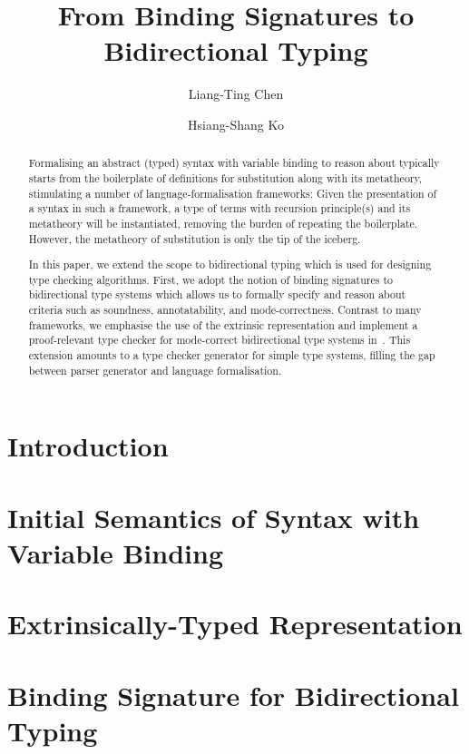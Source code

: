 \documentclass[envcountsect,runningheads,a4paper]{llncs}
\title{From Binding Signatures to Bidirectional Typing}
\author{Liang-Ting Chen\orcidID{0000-0002-3250-1331} \and Hsiang-Shang Ko\orcidID{0000-0002-2439-1048}}
\institute{Institute of Information Science, Academia Sinica, Taiwan}
\begin{document}
\maketitle

\begin{abstract}
  Formalising an abstract (typed) syntax with variable binding to reason about typically starts from the boilerplate of definitions for substitution along with its metatheory, stimulating a number of language-formalisation frameworks:
  Given the presentation of a syntax in such a framework, a type of terms with recursion principle(s) and its metatheory will be instantiated, removing the burden of repeating the boilerplate.
  However, the metatheory of substitution is only the tip of the iceberg.

  In this paper, we extend the scope to bidirectional typing which is used for designing type checking algorithms.
  First, we adopt the notion of binding signatures to bidirectional type systems which allows us to formally specify and reason about criteria such as soundness, annotatability, and mode-correctness.
  Contrast to many frameworks, we emphasise the use of the extrinsic representation and implement a proof-relevant type checker for mode-correct bidirectional type systems in \Agda.
  This extension amounts to a type checker generator for simple type systems, 
  filling the gap between parser generator and language formalisation.
\end{abstract}

\section{Introduction}
\section{Initial Semantics of Syntax with Variable Binding}
\section{Extrinsically-Typed Representation}
\section{Binding Signature for Bidirectional Typing}
\end{document}
